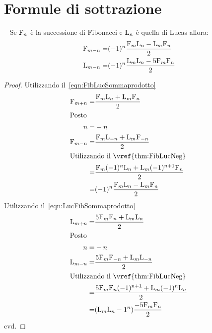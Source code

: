 \section{Formule di sottrazione}
\begin{thm}~\cite{Rabinowitz_1996}\label{thm:FibLucFormSottazione}
	Se $\mathrm{F}_{n}$ è la successione di Fibonacci e  $\mathrm{L}_{n}$ è quella di Lucas 
allora:
\begin{align}
	\mathrm{F}_{m-n}=&{}{}(-1)^n\dfrac{\mathrm{F}_{m}\mathrm{L}_{n}-\mathrm{L}_{m}\mathrm{F}_{n}}{2}\\
	\mathrm{L}_{m-n}=&{}{}(-1)^n\dfrac{\mathrm{L}_{m}\mathrm{L}_{n}-5\mathrm{F}_{m}\mathrm{F}_{n}}{2}
\end{align}
\end{thm}
\begin{proof}
Utilizzando il~\vref{eqn:FibLucSommaprodotto}
\begin{align*}
	\Fib{m+n}=&{}{}\dfrac{\Fib{m}\Luc{n}+\Luc{m}\Fib{n}}{2}\\
\intertext{Posto}
n=&{}{}-n\\
\Fib{m-n}=&{}{}\dfrac{\Fib{m}\Luc{-n}+\Luc{m}\Fib{-n}}{2}\\
\intertext{Utilizzando il~\vref{thm:FibLucNeg} }
=&{}{}\dfrac{\Fib{m}(-1)^n\Luc{n}+\Luc{m}(-1)^{n+1}\Fib{n}}{2}\\
=&{}{}(-1)^n\dfrac{\Fib{m}\Luc{n}-\Luc{m}\Fib{n}}{2}
\end{align*}
Utilizzando il~\vref{eqn:LucFibSommaprodotto}
\begin{align*}
\Luc{m+n}=&{}{}\dfrac{5\Fib{m}\Fib{n}+\Luc{m}\Luc{n}}{2}\\
\intertext{Posto}
n=&{}{}-n\\
\Luc{m-n}=&{}{}\dfrac{5\Fib{m}\Fib{-n}+\Luc{m}\Luc{-n}}{2}\\
\intertext{Utilizzando il~\vref{thm:FibLucNeg} }
=&{}{}\dfrac{5\Fib{m}\Fib{n}(-1)^{n+1}+\Luc{m}(-1)^n\Luc{n}}{2}\\
=&{}{}(\Luc{m}\Luc{n}-1^n)\dfrac{-5\Fib{m}\Fib{n}}{2}\\
\end{align*}
cvd.
\end{proof}
